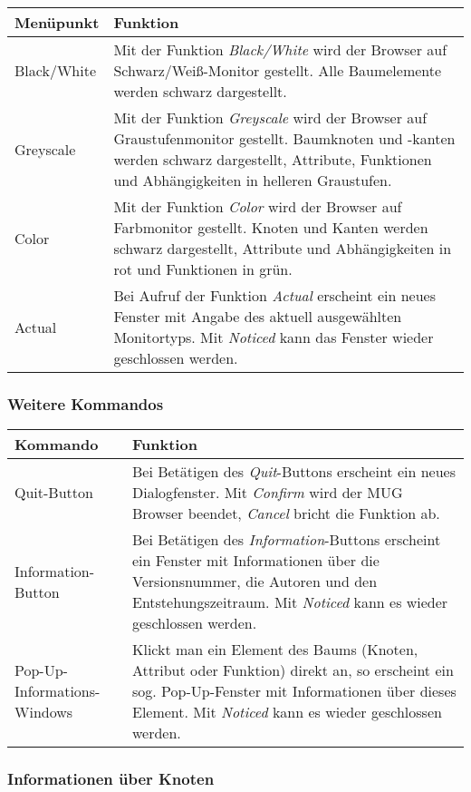 \bigskip
\begin{tabular}{|l|p{9.9cm}|}
\hline
Men\"upunkt               & Funktion      \\
\hline
Black/White &
Mit der Funktion {\it Black/White} wird der Browser auf Schwarz/Wei\ss{}-Monitor gestellt. Alle Baumelemente werden schwarz dargestellt. \\
Greyscale &
Mit der Funktion {\it Greyscale} wird der Browser auf Graustufenmonitor gestellt. Baumknoten und -kanten werden schwarz dargestellt, Attribute,
Funktionen und Abh\"angigkeiten in helleren Graustufen. \\ Color & Mit der Funktion {\it Color} wird der Browser auf Farbmonitor gestellt. Knoten und
Kanten werden schwarz dargestellt, Attribute und Abh\"angigkeiten in rot und Funktionen in gr\"un. \\ Actual & Bei Aufruf der Funktion {\it Actual}
erscheint ein neues Fenster mit Angabe des aktuell ausgew\"ahlten Monitortyps. Mit {\it Noticed} kann das Fenster wieder geschlossen werden. \\ \hline
\end{tabular}


\subsubsection{Weitere Kommandos}

\bigskip
\begin{tabular}{|l|p{7.3cm}|}
\hline
Kommando               & Funktion      \\
\hline
Quit-Button &
Bei Bet\"atigen des {\it Quit}-Buttons erscheint ein neues Dialogfenster. Mit {\it Confirm} wird der MUG Browser beendet, {\it Cancel} bricht die
Funktion ab. \\ Information-Button & Bei Bet\"atigen des {\it Information}-Buttons erscheint ein Fenster mit Informationen \"uber die Versionsnummer, die
Autoren und den Entstehungszeitraum. Mit {\it Noticed} kann es wieder geschlossen werden. \\ Pop-Up-Informations-Windows & Klickt man ein Element des
Baums (Knoten, Attribut oder Funktion) direkt an, so erscheint ein sog. Pop-Up-Fenster mit Informationen \"uber dieses Element. Mit {\it Noticed} kann
es wieder geschlossen werden. \\ \hline \end{tabular}

\subsubsection{Informationen \"uber Knoten}

